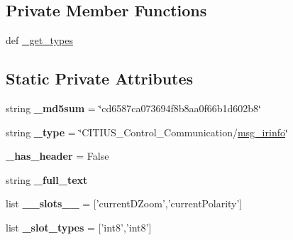 \subsection*{\-Private \-Member \-Functions}
\begin{DoxyCompactItemize}
\item 
def \hyperlink{class_c_i_t_i_u_s___control___communication_1_1msg_1_1__msg__irinfo_1_1msg__irinfo_a2f9dbfab873c782adc2abbe64c086ddb}{\-\_\-get\-\_\-types}
\end{DoxyCompactItemize}
\subsection*{\-Static \-Private \-Attributes}
\begin{DoxyCompactItemize}
\item 
\hypertarget{class_c_i_t_i_u_s___control___communication_1_1msg_1_1__msg__irinfo_1_1msg__irinfo_ae204ba2bc76e9e4582e29e53c9a496a5}{string {\bfseries \-\_\-md5sum} = \char`\"{}cd6587ca073694f8b8aa0f66b1d602b8\char`\"{}}\label{class_c_i_t_i_u_s___control___communication_1_1msg_1_1__msg__irinfo_1_1msg__irinfo_ae204ba2bc76e9e4582e29e53c9a496a5}

\item 
\hypertarget{class_c_i_t_i_u_s___control___communication_1_1msg_1_1__msg__irinfo_1_1msg__irinfo_a66d67f10b6ee4cd0e27c31e6f94dc772}{string {\bfseries \-\_\-type} = \char`\"{}\-C\-I\-T\-I\-U\-S\-\_\-\-Control\-\_\-\-Communication/\hyperlink{class_c_i_t_i_u_s___control___communication_1_1msg_1_1__msg__irinfo_1_1msg__irinfo}{msg\-\_\-irinfo}\char`\"{}}\label{class_c_i_t_i_u_s___control___communication_1_1msg_1_1__msg__irinfo_1_1msg__irinfo_a66d67f10b6ee4cd0e27c31e6f94dc772}

\item 
\hypertarget{class_c_i_t_i_u_s___control___communication_1_1msg_1_1__msg__irinfo_1_1msg__irinfo_ae058d07a627515c6448c700abafdfeae}{{\bfseries \-\_\-has\-\_\-header} = \-False}\label{class_c_i_t_i_u_s___control___communication_1_1msg_1_1__msg__irinfo_1_1msg__irinfo_ae058d07a627515c6448c700abafdfeae}

\item 
string {\bfseries \-\_\-full\-\_\-text}
\item 
\hypertarget{class_c_i_t_i_u_s___control___communication_1_1msg_1_1__msg__irinfo_1_1msg__irinfo_a55c0c375e21f640a9c0587823119cc56}{list {\bfseries \-\_\-\-\_\-slots\-\_\-\-\_\-} = \mbox{[}'current\-D\-Zoom','current\-Polarity'\mbox{]}}\label{class_c_i_t_i_u_s___control___communication_1_1msg_1_1__msg__irinfo_1_1msg__irinfo_a55c0c375e21f640a9c0587823119cc56}

\item 
\hypertarget{class_c_i_t_i_u_s___control___communication_1_1msg_1_1__msg__irinfo_1_1msg__irinfo_a60554f90bb2472a062c0cd5bb25386e5}{list {\bfseries \-\_\-slot\-\_\-types} = \mbox{[}'int8','int8'\mbox{]}}\label{class_c_i_t_i_u_s___control___communication_1_1msg_1_1__msg__irinfo_1_1msg__irinfo_a60554f90bb2472a062c0cd5bb25386e5}

\end{DoxyCompactItemize}


